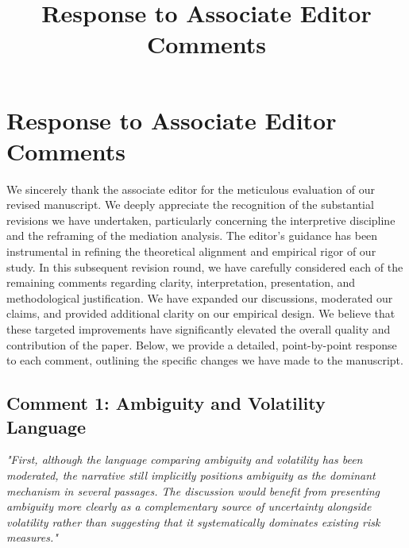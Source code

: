 \documentclass[12pt]{article}
\title{Response to Associate Editor Comments}
\author{}
\date{}
\begin{document}
\maketitle

\section*{Response to Associate Editor Comments}

We sincerely thank the associate editor for the meticulous evaluation of our revised manuscript. We deeply appreciate the recognition of the substantial revisions we have undertaken, particularly concerning the interpretive discipline and the reframing of the mediation analysis. The editor's guidance has been instrumental in refining the theoretical alignment and empirical rigor of our study. In this subsequent revision round, we have carefully considered each of the remaining comments regarding clarity, interpretation, presentation, and methodological justification. We have expanded our discussions, moderated our claims, and provided additional clarity on our empirical design. We believe that these targeted improvements have significantly elevated the overall quality and contribution of the paper. Below, we provide a detailed, point-by-point response to each comment, outlining the specific changes we have made to the manuscript.

\subsection*{Comment 1: Ambiguity and Volatility Language}
\textit{"First, although the language comparing ambiguity and volatility has been moderated, the narrative still implicitly positions ambiguity as the dominant mechanism in several passages. The discussion would benefit from presenting ambiguity more clearly as a complementary source of uncertainty alongside volatility rather than suggesting that it systematically dominates existing risk measures."}
\end{document}

